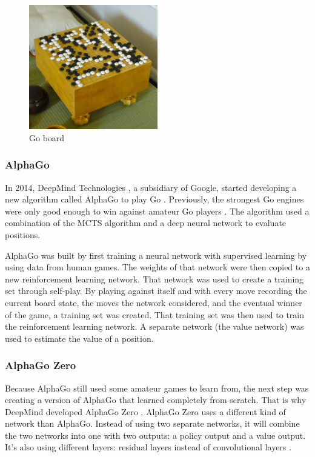 \documentclass{article}
\begin{document}
\begin{figure}[H]
    \centering
    \includegraphics[width=0.5\textwidth]{img/go.jpg}
    \caption{Go board \cite{GoGame2022}}
\end{figure}

\subsubsection{AlphaGo}

In 2014, DeepMind Technologies \cite{DeepMind2022}, a subsidiary of Google, 
started developing a new algorithm called AlphaGo to play Go \cite{AlphaGo2022a}. 
Previously, the strongest Go engines were only good enough to win against amateur Go players \cite{AlphaGo}.
The algorithm used a combination of the MCTS algorithm and a deep neural network to evaluate positions. 

AlphaGo was built \cite{AlphaGo, MasteringGameGo}  by first training a neural network with supervised learning by using data from human games.
The weights of that network were then copied to a new reinforcement learning network. That network was used to 
create a training set through self-play. By playing against itself and with every move recording the current board state, the 
moves the network considered, and the eventual winner of the game, a training set was created.
That training set was then used to train the reinforcement learning network. A separate network (the value network) 
was used to estimate the value of a position. 

\subsubsection{AlphaGo Zero}

Because AlphaGo still used some amateur games to learn from, the next step was creating a version of AlphaGo
that learned completely from scratch. That is why DeepMind developed AlphaGo Zero \cite{AlphaGoZero2022}.
AlphaGo Zero uses a different kind of network than AlphaGo. Instead of using two separate networks, 
it will combine the two networks into one with two outputs: a policy output and a value output.
It's also using different layers: residual layers instead of convolutional layers \cite{MasteringGameZero}. 
\end{document}

